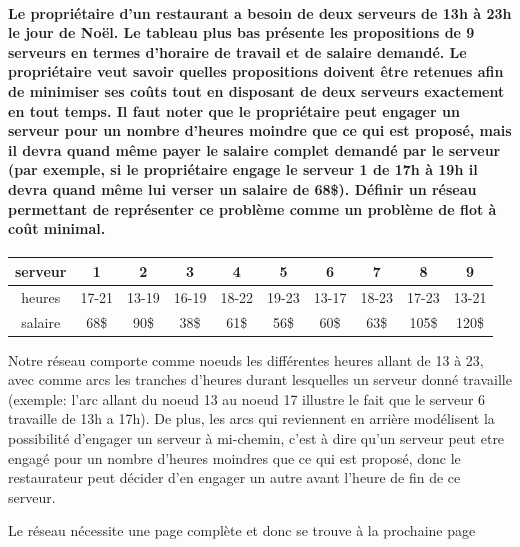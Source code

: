 \documentclass{article}
\begin{document}
\paragraph{Le propriétaire d’un restaurant a besoin de deux serveurs de 13h à 23h le jour de Noël. Le tableau plus bas présente les propositions de 9 serveurs en termes d’horaire de travail et de salaire demandé. Le propriétaire veut savoir quelles propositions doivent être retenues afin de minimiser ses coûts tout en disposant de deux serveurs exactement en tout temps. Il faut noter que le propriétaire peut engager un serveur pour un nombre d’heures moindre que ce qui est proposé, mais il devra quand même payer le salaire complet demandé par le serveur (par exemple, si le propriétaire engage le serveur 1 de 17h à 19h il devra quand même lui verser un salaire de 68\$). Définir un réseau permettant de représenter ce problème comme un problème de flot à coût minimal.}

\begin{center}
\begin{table}[H]
\begin{center}
    \begin{tabular}{|c|c|c|c|c|c|c|c|c|c|}
        \hline
        serveur & 1     & 2     & 3     & 4     & 5     & 6     & 7     & 8     & 9     \\ \hline
        heures  & 17-21 & 13-19 & 16-19 & 18-22 & 19-23 & 13-17 & 18-23 & 17-23 & 13-21 \\ \hline
        salaire & 68\$  & 90\$  & 38\$  & 61\$  & 56\$  & 60\$  & 63\$  & 105\$ & 120\$ \\ \hline
    \end{tabular}
    \end{center}
\end{table}
\end{center}
Notre réseau comporte comme noeuds les différentes heures allant de 13 à 23, avec comme arcs les tranches d'heures durant lesquelles un serveur donné travaille (exemple: l'arc allant du noeud 13 au noeud 17 illustre le fait que le serveur 6 travaille de 13h a 17h). De plus, les arcs qui reviennent en arrière modélisent la possibilité d'engager un serveur à mi-chemin, c'est à dire qu'un serveur peut etre engagé pour un nombre d'heures moindres que ce qui est proposé, donc le restaurateur peut décider d'en engager un autre avant l'heure de fin de ce serveur.

\begin{center}
\Huge{Le réseau nécessite  une page complète et donc se trouve à la prochaine page}
\end{center}
\end{document}
